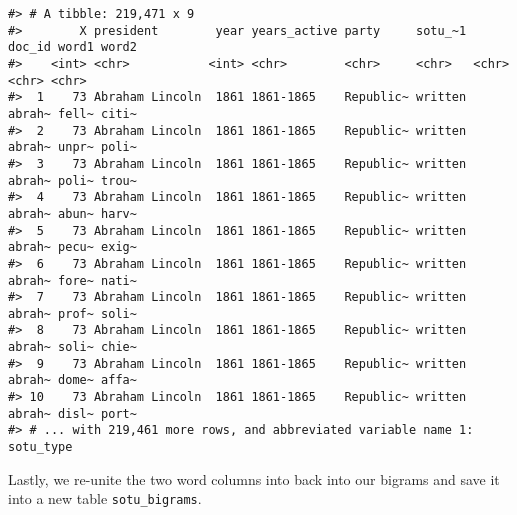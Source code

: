 \documentclass[
]{book}
\newenvironment{Shaded}{\begin{snugshade}}{\end{snugshade}}
\newcommand{\AttributeTok}[1]{\textcolor[rgb]{0.77,0.63,0.00}{#1}}
\newcommand{\CommentTok}[1]{\textcolor[rgb]{0.56,0.35,0.01}{\textit{#1}}}
\newcommand{\ConstantTok}[1]{\textcolor[rgb]{0.00,0.00,0.00}{#1}}
\newcommand{\DecValTok}[1]{\textcolor[rgb]{0.00,0.00,0.81}{#1}}
\newcommand{\FunctionTok}[1]{\textcolor[rgb]{0.00,0.00,0.00}{#1}}
\newcommand{\NormalTok}[1]{#1}
\newcommand{\OtherTok}[1]{\textcolor[rgb]{0.56,0.35,0.01}{#1}}
\newcommand{\SpecialCharTok}[1]{\textcolor[rgb]{0.00,0.00,0.00}{#1}}
\newcommand{\StringTok}[1]{\textcolor[rgb]{0.31,0.60,0.02}{#1}}
\begin{document}
\begin{verbatim}
#> # A tibble: 219,471 x 9
#>        X president        year years_active party     sotu_~1 doc_id word1 word2
#>    <int> <chr>           <int> <chr>        <chr>     <chr>   <chr>  <chr> <chr>
#>  1    73 Abraham Lincoln  1861 1861-1865    Republic~ written abrah~ fell~ citi~
#>  2    73 Abraham Lincoln  1861 1861-1865    Republic~ written abrah~ unpr~ poli~
#>  3    73 Abraham Lincoln  1861 1861-1865    Republic~ written abrah~ poli~ trou~
#>  4    73 Abraham Lincoln  1861 1861-1865    Republic~ written abrah~ abun~ harv~
#>  5    73 Abraham Lincoln  1861 1861-1865    Republic~ written abrah~ pecu~ exig~
#>  6    73 Abraham Lincoln  1861 1861-1865    Republic~ written abrah~ fore~ nati~
#>  7    73 Abraham Lincoln  1861 1861-1865    Republic~ written abrah~ prof~ soli~
#>  8    73 Abraham Lincoln  1861 1861-1865    Republic~ written abrah~ soli~ chie~
#>  9    73 Abraham Lincoln  1861 1861-1865    Republic~ written abrah~ dome~ affa~
#> 10    73 Abraham Lincoln  1861 1861-1865    Republic~ written abrah~ disl~ port~
#> # ... with 219,461 more rows, and abbreviated variable name 1: sotu_type
\end{verbatim}

Lastly, we re-unite the two word columns into back into our bigrams and save it into a new table \texttt{sotu\_bigrams}.

\begin{Shaded}
\end{Shaded}
\end{document}
